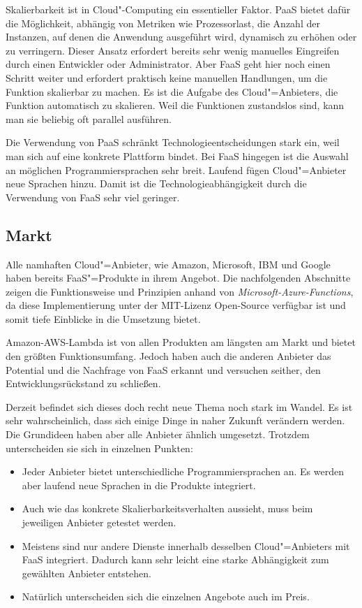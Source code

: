 Skalierbarkeit ist in Cloud"-Computing ein essentieller Faktor. PaaS bietet dafür die Möglichkeit, abhängig von Metriken wie Prozessorlast, die Anzahl der Instanzen, auf denen die Anwendung ausgeführt wird, dynamisch zu erhöhen oder zu verringern. Dieser Ansatz erfordert bereits sehr wenig manuelles Eingreifen durch einen Entwickler oder Administrator. Aber FaaS geht hier noch einen Schritt weiter und erfordert praktisch keine manuellen Handlungen, um die Funktion skalierbar zu machen. Es ist die Aufgabe des Cloud"=Anbieters, die Funktion automatisch zu skalieren. Weil die Funktionen zustandslos sind, kann man sie beliebig oft parallel ausführen.

Die Verwendung von PaaS schränkt Technologieentscheidungen stark ein, weil man sich auf eine konkrete Plattform bindet. Bei FaaS hingegen ist die Auswahl an möglichen Programmiersprachen sehr breit. Laufend fügen Cloud"=Anbieter neue Sprachen hinzu. Damit ist die Technologieabhängigkeit durch die Verwendung von FaaS sehr viel geringer.

\subsection{Markt}

Alle namhaften Cloud"=Anbieter, wie Amazon, Microsoft, IBM und Google haben bereits FaaS"=Produkte in ihrem Angebot. Die nachfolgenden Abschnitte zeigen die Funktionsweise und Prinzipien anhand von \textit{Microsoft-Azure-Functions}, da diese Implementierung unter der MIT-Lizenz Open-Source verfügbar ist und somit tiefe Einblicke in die Umsetzung bietet. 

Amazon-AWS-Lambda ist von allen Produkten am längsten am Markt und bietet den größten Funktionsumfang. Jedoch haben auch die anderen Anbieter das Potential und die Nachfrage von FaaS erkannt und versuchen seither, den Entwicklungsrückstand zu schließen.

Derzeit befindet sich dieses doch recht neue Thema noch stark im Wandel. Es ist sehr wahrscheinlich, dass sich einige Dinge in naher Zukunft verändern werden. Die Grundideen haben aber alle Anbieter ähnlich umgesetzt. Trotzdem unterscheiden sie sich in einzelnen Punkten:

\begin{itemize}
	\item Jeder Anbieter bietet unterschiedliche Programmiersprachen an. Es werden aber laufend neue Sprachen in die Produkte integriert.
	\item Auch wie das konkrete Skalierbarkeitsverhalten aussieht, muss beim jeweiligen Anbieter getestet werden.
	\item Meistens sind nur andere Dienste innerhalb desselben Cloud"=Anbieters mit FaaS integriert. Dadurch kann sehr leicht eine starke Abhängigkeit zum gewählten Anbieter entstehen.
	\item Natürlich unterscheiden sich die einzelnen Angebote auch im Preis.
\end{itemize}

